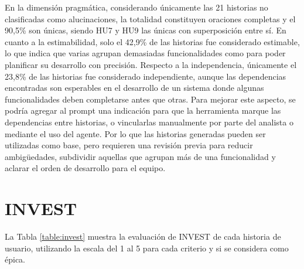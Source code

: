 En la dimensión pragmática, considerando únicamente las 21 historias no clasificadas como alucinaciones, la totalidad constituyen oraciones completas y el 90,5\% son únicas, siendo HU7 y HU9 las únicas con superposición entre sí. En cuanto a la estimabilidad, solo el 42,9\% de las historias fue considerado estimable, lo que indica que varias agrupan demasiadas funcionalidades como para poder planificar su desarrollo con precisión. Respecto a la independencia, únicamente el 23,8\% de las historias fue considerado independiente, aunque las dependencias encontradas son esperables en el desarrollo de un sistema donde algunas funcionalidades deben completarse antes que otras. Para mejorar este aspecto, se podría agregar al prompt una indicación para que la herramienta marque las dependencias entre historias, o vincularlas manualmente por parte del analista o mediante el uso del agente. Por lo que las historias generadas pueden ser utilizadas como base, pero requieren una revisión previa para reducir ambigüedades, subdividir aquellas que agrupan más de una funcionalidad y aclarar el orden de desarrollo para el equipo.

\section{INVEST}

La Tabla \ref{table:invest} muestra la evaluación de INVEST de cada historia de usuario, utilizando la escala del 1 al 5 para cada criterio y si se considera como épica.

